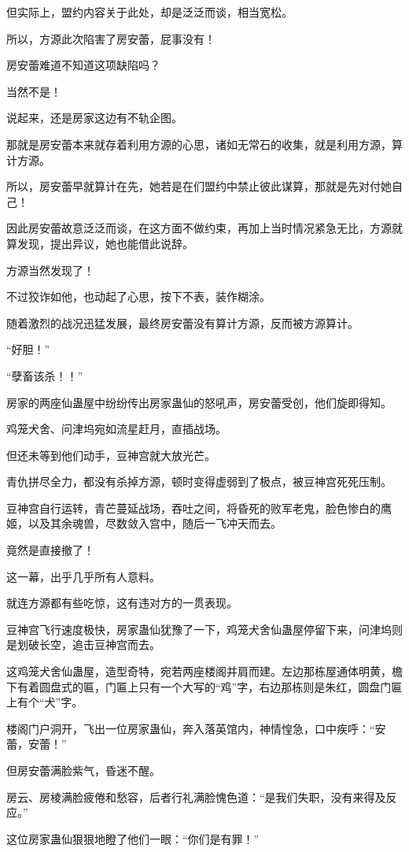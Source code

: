 \begin{this_body}
但实际上，盟约内容关于此处，却是泛泛而谈，相当宽松。

所以，方源此次陷害了房安蕾，屁事没有！

房安蕾难道不知道这项缺陷吗？

当然不是！

说起来，还是房家这边有不轨企图。

那就是房安蕾本来就存着利用方源的心思，诸如无常石的收集，就是利用方源，算计方源。

所以，房安蕾早就算计在先，她若是在们盟约中禁止彼此谋算，那就是先对付她自己！

因此房安蕾故意泛泛而谈，在这方面不做约束，再加上当时情况紧急无比，方源就算发现，提出异议，她也能借此说辞。

方源当然发现了！

不过狡诈如他，也动起了心思，按下不表，装作糊涂。

随着激烈的战况迅猛发展，最终房安蕾没有算计方源，反而被方源算计。

“好胆！”

“孽畜该杀！！”

房家的两座仙蛊屋中纷纷传出房家蛊仙的怒吼声，房安蕾受创，他们旋即得知。

鸡笼犬舍、问津坞宛如流星赶月，直插战场。

但还未等到他们动手，豆神宫就大放光芒。

青仇拼尽全力，都没有杀掉方源，顿时变得虚弱到了极点，被豆神宫死死压制。

豆神宫自行运转，青芒蔓延战场，吞吐之间，将昏死的败军老鬼，脸色惨白的鹰姬，以及其余魂兽，尽数敛入宫中，随后一飞冲天而去。

竟然是直接撤了！

这一幕，出乎几乎所有人意料。

就连方源都有些吃惊，这有违对方的一贯表现。

豆神宫飞行速度极快，房家蛊仙犹豫了一下，鸡笼犬舍仙蛊屋停留下来，问津坞则是划破长空，追击豆神宫而去。

这鸡笼犬舍仙蛊屋，造型奇特，宛若两座楼阁并肩而建。左边那栋屋通体明黄，檐下有着圆盘式的匾，门匾上只有一个大写的“鸡”字，右边那栋则是朱红，圆盘门匾上有个“犬”字。

楼阁门户洞开，飞出一位房家蛊仙，奔入落英馆内，神情惶急，口中疾呼：“安蕾，安蕾！”

但房安蕾满脸紫气，昏迷不醒。

房云、房棱满脸疲倦和愁容，后者行礼满脸愧色道：“是我们失职，没有来得及反应。”

这位房家蛊仙狠狠地瞪了他们一眼：“你们是有罪！”


\end{this_body}
